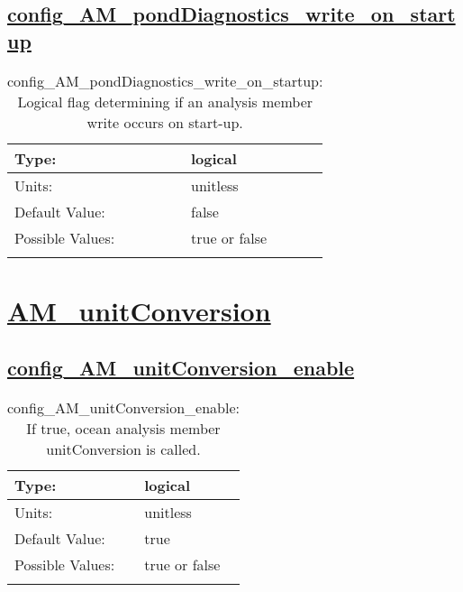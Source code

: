 \subsection[config\_AM\_pondDiagnostics\_write\_on\_startup]{\hyperref[sec:nm_tab_AM_pondDiagnostics]{config\_AM\_pondDiagnostics\_write\_on\_startup}}
\label{subsec:nm_sec_config_AM_pondDiagnostics_write_on_startup}
\begin{center}
\begin{longtable}{| p{2.0in} || p{4.0in} |}
    \hline
    Type: & logical \\
    \hline
    Units: & \si{unitless} \\
    \hline
    Default Value: & false \\
    \hline
    Possible Values: & true or false \\
    \hline
    \caption{config\_AM\_pondDiagnostics\_write\_on\_startup: Logical flag determining if an analysis member write occurs on start-up.}
\end{longtable}
\end{center}
\section[AM\_unitConversion]{\hyperref[sec:nm_tab_AM_unitConversion]{AM\_unitConversion}}
\label{sec:nm_sec_AM_unitConversion}
\subsection[config\_AM\_unitConversion\_enable]{\hyperref[sec:nm_tab_AM_unitConversion]{config\_AM\_unitConversion\_enable}}
\label{subsec:nm_sec_config_AM_unitConversion_enable}
\begin{center}
\begin{longtable}{| p{2.0in} || p{4.0in} |}
    \hline
    Type: & logical \\
    \hline
    Units: & \si{unitless} \\
    \hline
    Default Value: & true \\
    \hline
    Possible Values: & true or false \\
    \hline
    \caption{config\_AM\_unitConversion\_enable: If true, ocean analysis member unitConversion is called.}
\end{longtable}
\end{center}
